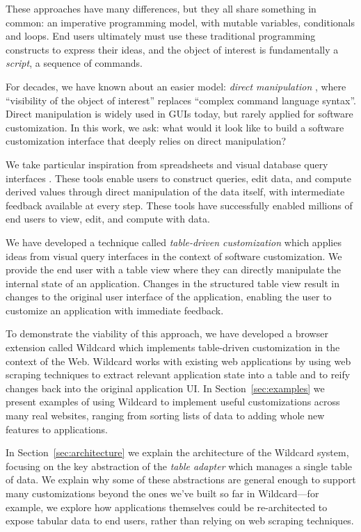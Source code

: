 \documentclass[sigplan,10pt,anonymous,review]{acmart}
\begin{document}
These approaches have many differences, but they all share something in
common: an imperative programming model, with mutable variables,
conditionals and loops. End users ultimately must use these traditional
programming constructs to express their ideas, and the object of
interest is fundamentally a \emph{script}, a sequence of commands.

For decades, we have known about an easier model: \emph{direct
manipulation} \citep{shneiderman1983}, where ``visibility of the object
of interest'' replaces ``complex command language syntax''. Direct
manipulation is widely used in GUIs today, but rarely applied for
software customization. In this work, we ask: what would it look like to
build a software customization interface that deeply relies on direct
manipulation?

We take particular inspiration from spreadsheets and visual database
query interfaces \citep{2020a, bakke2016}. These tools enable users to
construct queries, edit data, and compute derived values through direct
manipulation of the data itself, with intermediate feedback available at
every step. These tools have successfully enabled millions of end users
to view, edit, and compute with data.

We have developed a technique called \emph{table-driven customization}
which applies ideas from visual query interfaces in the context of
software customization. We provide the end user with a table view where
they can directly manipulate the internal state of an application.
Changes in the structured table view result in changes to the original
user interface of the application, enabling the user to customize an
application with immediate feedback.

To demonstrate the viability of this approach, we have developed a
browser extension called Wildcard which implements table-driven
customization in the context of the Web. Wildcard works with existing
web applications by using web scraping techniques to extract relevant
application state into a table and to reify changes back into the
original application UI. In Section~\ref{sec:examples} we present
examples of using Wildcard to implement useful customizations across
many real websites, ranging from sorting lists of data to adding whole
new features to applications.

In Section~\ref{sec:architecture} we explain the architecture of the
Wildcard system, focusing on the key abstraction of the \emph{table
adapter} which manages a single table of data. We explain why some of
these abstractions are general enough to support many customizations
beyond the ones we've built so far in Wildcard---for example, we explore
how applications themselves could be re-architected to expose tabular
data to end users, rather than relying on web scraping techniques.
\end{document}
